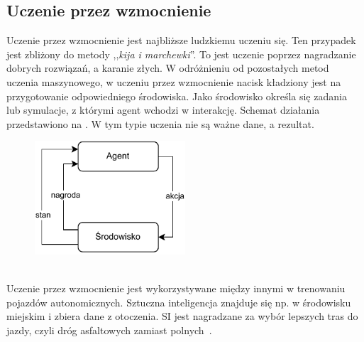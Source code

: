 \subsection{Uczenie przez wzmocnienie}
Uczenie przez wzmocnienie jest najbliższe ludzkiemu uczeniu się. Ten przypadek jest zbliżony do metody ,,\textit{kija i marchewki}''. To jest uczenie poprzez nagradzanie dobrych rozwiązań, a karanie złych. W odróżnieniu od pozostałych metod uczenia maszynowego, w uczeniu przez wzmocnienie nacisk kładziony jest na przygotowanie odpowiedniego środowiska. Jako środowisko określa się zadania lub symulacje, z którymi agent wchodzi w interakcję. Schemat działania przedstawiono na . W tym typie uczenia nie są ważne dane, a rezultat.

\begin{figure}[H]
    \centering
    \includegraphics[width=0.5\textwidth]{images/reinforcemen}
    \label{fig:reinforcemenet}
\end{figure}
\ \\
Uczenie przez wzmocnienie jest wykorzystywane między innymi w trenowaniu pojazdów autonomicznych. Sztuczna inteligencja znajduje się np. w środowisku miejskim i zbiera dane z otoczenia. SI jest nagradzane za wybór lepszych tras do jazdy, czyli dróg asfaltowych zamiast polnych~\cite{AiScience, Mahesh2018}.


